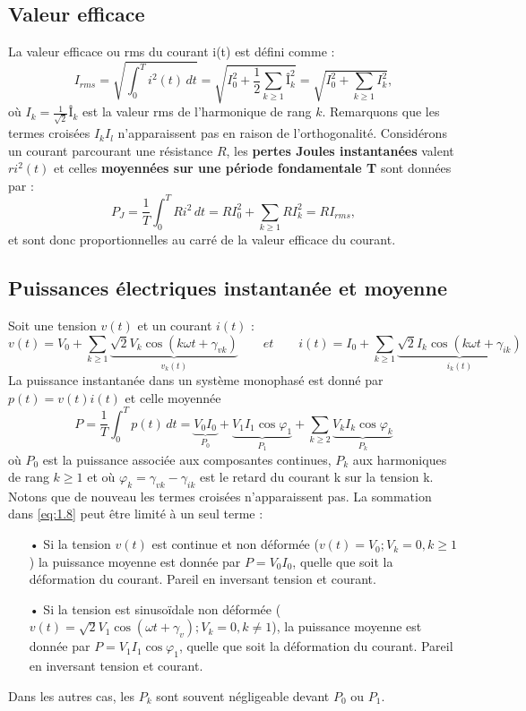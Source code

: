 	\subsection{Valeur efficace}
		La valeur efficace ou rms du courant i(t) est défini comme :
		\begin{equation}
			I_{rms} = \sqrt{\int _0 ^T i^2(t) \, dt} = \sqrt{I_0^2 + \frac{1}{2}\sum _{k\geq 1}Î_k ^2 } = \sqrt{I_0^2 + \sum _{k\geq 1} I_k^2},
		\end{equation}
		où $I_k = \frac{1}{\sqrt{2}}Î_k$ est la valeur rms de l'harmonique de rang $k$. Remarquons que les termes croisées $I_kI_l$ n'apparaissent pas en raison de l'orthogonalité. Considérons un courant parcourant une résistance $R$, les \textbf{pertes Joules instantanées} valent $ri^2(t)$ et celles \textbf{moyennées sur une période fondamentale T} sont données par : 
		\begin{equation}
			P_J = \frac{1}{T}\int _0^T Ri^2 \, dt = RI_0^2 + \sum _{k\geq 1} RI_k^2 = RI_{rms},
		\end{equation}
		et sont donc proportionnelles au carré de la valeur efficace du courant. 
		
	\subsection{Puissances électriques instantanée et moyenne}
		Soit une tension $v(t)$ et un courant $i(t)$ :
		\begin{equation}
			v(t) = V_0 + \sum _{k \geq 1} \underbrace{\sqrt{2} V_k \cos (k\omega t+ \gamma _{vk})}_{v_k(t)} \qquad et \qquad
			i(t) = I_0 + \sum _{k \geq 1} \underbrace{\sqrt{2} I_k \cos (k\omega t+ \gamma _{ik})}_{i_k(t)}
		\end{equation}
		La puissance instantanée dans un système monophasé est donné par $p(t) = v(t)i(t)$ et celle moyennée 
		\begin{equation}
			P = \frac{1}{T}\int _0 ^T p(t)\, dt = \underbrace{V_0I_0}_{P_0} + \underbrace{V_1I_1\cos \varphi _1}_{P_1} + \sum _{k\geq 2}\underbrace{V_kI_k \cos \varphi _k}_{P_k}
			\label{eq:1.8}
		\end{equation}
		où $P_0$ est la puissance associée aux composantes continues, $P_k$ aux harmoniques de rang $k\geq 1$ et où $\varphi _k = \gamma _{vk} - \gamma _{ik}$ est le retard du courant k sur la tension k. Notons que de nouveau les termes croisées n'apparaissent pas. La sommation dans \eqref{eq:1.8} peut être limité à un seul terme :
		\begin{itemize}
			\item[•] Si la tension $v(t)$ est continue et non déformée ($v(t) = V_0; V_k = 0, k\geq 1$) la puissance moyenne est donnée par $P = V_0I_0$, quelle que soit la déformation du courant. Pareil en inversant tension et courant. 
		 
			\item[•] Si la tension est sinusoïdale non déformée ($v(t) = \sqrt{2}V_1\cos (\omega t + \gamma _v); V_k = 0, k\neq 1$), la puissance moyenne est donnée par $P = V_1I_1\cos \varphi _1$, quelle que soit la déformation du courant. Pareil en inversant tension et courant. 
		\end{itemize}
		Dans les autres cas, les $P_k$ sont souvent négligeable devant $P_0$ ou $P_1$. 
		
